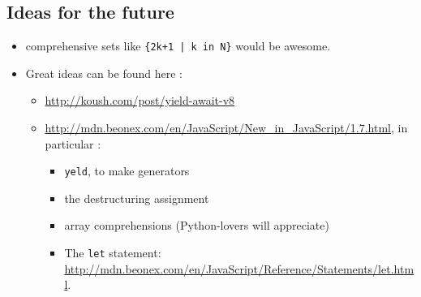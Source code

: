 \documentclass{article}
\begin{document}
\begin{sloppypar}
   

\subsection*{ Ideas for the future}


\begin{itemize}
	\item{ comprehensive sets like \lstinline!{2k+1 | k in N}! would be awesome.}
	\item{ Great ideas can be found here :
\begin{itemize}
	\item{ \href{http://koush.com/post/yield-await-v8}{http://koush.com/post/yield-await-v8}}
	\item{ \href{http://mdn.beonex.com/en/JavaScript/New\_in\_JavaScript/1.7.html}{http://mdn.beonex.com/en/JavaScript/New\_in\_JavaScript/1.7.html}, in particular :
\begin{itemize}
	\item{ \lstinline!yeld!, to make generators}
	\item{ the destructuring assignment}
	\item{ array comprehensions (Python-lovers will appreciate)}
	\item{ The \lstinline!let! statement: \href{http://mdn.beonex.com/en/JavaScript/Reference/Statements/let.html}{http://mdn.beonex.com/en/JavaScript/Reference/Statements/let.html}.}
\end{itemize}
}
\end{itemize}
}
\end{itemize}

\end{sloppypar}
\end{document}
